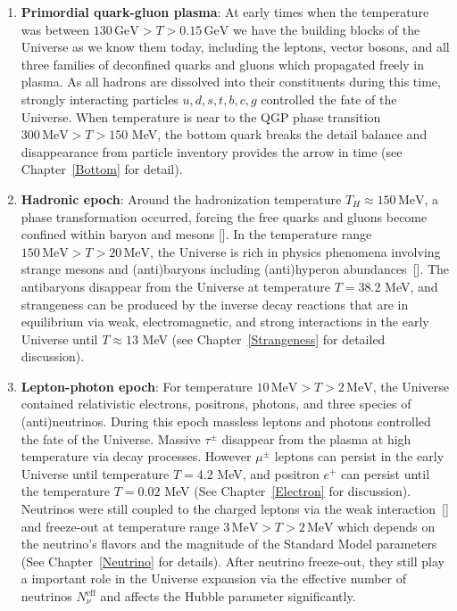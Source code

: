 \begin{enumerate}
 \item \textbf{Primordial quark-gluon plasma}: 
 At early times when the temperature was between $130\,\mathrm{GeV}>T>0.15\,\mathrm{GeV}$ we have the building blocks of the Universe as we know them today, including the leptons, vector bosons, and all three families of deconfined quarks and gluons which propagated freely in plasma. As all hadrons are dissolved into their constituents during this time, strongly interacting particles $u,d,s,t,b,c,g$ controlled the fate of the Universe. When temperature is near to the QGP phase transition $300\, \mathrm{MeV}>T>150$ MeV, the bottom quark breaks the detail balance and disappearance from particle inventory provides the arrow in time (see Chapter~\ref{Bottom} for detail).
 
 \item \textbf{Hadronic epoch}: Around the hadronization temperature $T_H\approx150\,\mathrm{MeV}$, a phase transformation occurred, forcing 
 the free quarks and gluons become confined within baryon and mesons [\cite{Letessier:2005qe}]. In the temperature range $ 150\,\mathrm{MeV}>T>20\,\mathrm{MeV}$, the Universe is rich in physics phenomena involving strange mesons and (anti)baryons including (anti)hyperon abundances~[\cite{Fromerth:2012fe,Yang:2021bko}]. The antibaryons disappear from the Universe at temperature $T=38.2$ MeV, and strangeness can be produced by the inverse decay reactions that are in equilibrium via weak, electromagnetic, and strong interactions in the early Universe until $T\approx13$ MeV (see Chapter~\ref{Strangeness} for detailed discussion).

 
 \item \textbf{Lepton-photon epoch}: For temperature $10\,\mathrm{MeV}>T>2\,\mathrm{MeV}$, the Universe contained relativistic electrons, positrons, photons, and three species of (anti)neutrinos. During this epoch massless leptons and photons controlled the fate of the Universe. Massive $\tau^\pm$ disappear from the plasma at high temperature via decay processes. However $\mu^\pm$ leptons can persist in the early Universe until temperature $T=4.2$ MeV, and positron $e^+$ can persist until the temperature $T=0.02$ MeV (See Chapter~\ref{Electron} for discussion).
 Neutrinos were still coupled to the charged leptons via the weak interaction~[\cite{Birrell:2012gg,Birrell:2014ona}] and freeze-out at temperature range $3\,\mathrm{MeV}>T>2\,\mathrm{MeV}$ which depends on the neutrino's flavors and the magnitude of the Standard Model parameters (See Chapter~\ref{Neutrino} for details). After neutrino freeze-out, they still play a important role in the Universe expansion via the effective number of neutrinos $N_{\nu}^{\mathrm{eff}}$ and affects the Hubble parameter significantly. 
 

\end{enumerate}
